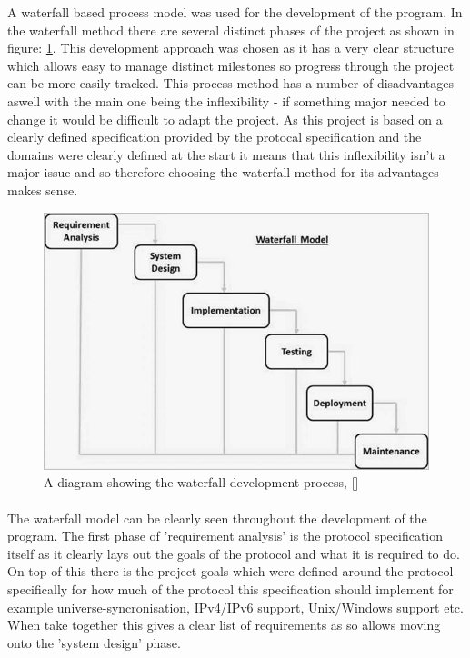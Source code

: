 \documentclass[11pt,a4paper,notitlepage]{report}
\begin{document}
	A waterfall based process model was used for the development of the program. In the waterfall
	method there are several distinct phases of the project as shown in figure: \ref{waterfall-diag}. This 
	development approach was chosen as it has a very clear structure which allows easy to manage distinct milestones 
	so progress through the project can be more easily tracked. This process method has a number of disadvantages aswell
	with the main one being the inflexibility - if something major needed to change it would be difficult to adapt the project. 
	As this project is based on a clearly defined specification provided by the protocal specification and the domains were 
	clearly defined at the start it means that this inflexibility isn't a major issue and so therefore choosing the waterfall 
	method for its advantages makes sense. 
	
	\begin{figure}
		\label{waterfall-diag}
		\includegraphics[width=\textwidth]{sdlc_waterfall_model.jpg}
		\caption{A diagram showing the waterfall development process, [\cite{waterfall-diagram}]}
	\end{figure}

	\paragraph*{}
	The waterfall model can be clearly seen throughout the development of the program. The first phase of 'requirement analysis'
	is the protocol specification itself as it clearly lays out the goals of the protocol and what it is required to do. On top of this
	there is the project goals which were defined around the protocol specifically for how much of the protocol this specification should
	implement for example universe-syncronisation, IPv4/IPv6 support, Unix/Windows support etc. When take together this gives a clear list of
	requirements as so allows moving onto the 'system design' phase.
\end{document}
